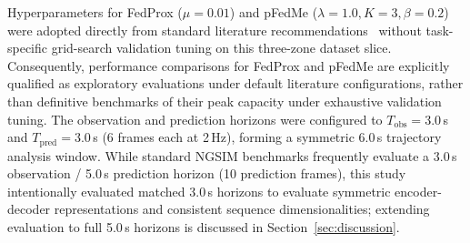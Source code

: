 \documentclass[journal]{IEEEtran}
\begin{document}
Hyperparameters for FedProx ($\mu = 0.01$) and pFedMe ($\lambda = 1.0, K = 3, \beta = 0.2$) were adopted directly from standard literature recommendations~\cite{li2020federated,dinh2020personalized} without task-specific grid-search validation tuning on this three-zone dataset slice. Consequently, performance comparisons for FedProx and pFedMe are explicitly qualified as exploratory evaluations under default literature configurations, rather than definitive benchmarks of their peak capacity under exhaustive validation tuning. The observation and prediction horizons were configured to $T_{\mathrm{obs}} = 3.0$\,s and $T_{\mathrm{pred}} = 3.0$\,s (6 frames each at 2\,Hz), forming a symmetric 6.0\,s trajectory analysis window. While standard NGSIM benchmarks frequently evaluate a 3.0\,s observation / 5.0\,s prediction horizon (10 prediction frames), this study intentionally evaluated matched 3.0\,s horizons to evaluate symmetric encoder-decoder representations and consistent sequence dimensionalities; extending evaluation to full 5.0\,s horizons is discussed in Section~\ref{sec:discussion}.
\end{document}
